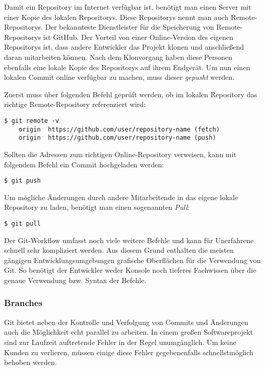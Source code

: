 Damit ein Repository im Internet verfügbar ist, benötigt man einen Server mit
einer Kopie des lokalen Repositorys. Diese Repositorys nennt man auch
Remote-Repositorys. Der bekannteste Dienstleister für die Speicherung
von Remote-Repositorys ist GitHub. Der Vorteil von einer Online-Version des
eigenen Repositorys ist, dass andere Entwickler das Projekt klonen und
anschließend daran mitarbeiten können. Nach dem Klonvorgang haben diese Personen
ebenfalls eine lokale Kopie des Repositorys auf ihrem Endgerät. Um nun einen
lokalen Commit online verfügbar zu machen, muss dieser \emph{gepusht} werden.

Zuerst muss über folgenden Befehl geprüft werden, ob im lokalen Repository das
richtige Remote-Repository referenziert wird:

\begin{lstlisting}[style=Bash]
    $ git remote -v
    origin	https://github.com/user/repository-name (fetch)
    origin	https://github.com/user/repository-name (push)
\end{lstlisting}

Sollten die Adressen zum richtigen Online-Repository verweisen, kann mit
folgendem Befehl ein Commit hochgeladen werden:

\begin{lstlisting}[style=Bash]
    $ git push
\end{lstlisting}

\newpage

Um mögliche Änderungen durch andere Mitarbeitende in das eigene lokale
Repository zu laden, benötigt man einen sogenannten \emph{Pull}:

\begin{lstlisting}[style=Bash]
    $ git pull
\end{lstlisting}

Der Git-Workflow umfasst noch viele weitere Befehle und kann für Unerfahrene
schnell sehr kompliziert werden. Aus diesem Grund enthalten die meisten gängigen
Entwicklungsumgebungen grafische Oberflächen für die Verwendung von Git. So
benötigt der Entwickler weder Konsole noch tieferes Fachwissen über die genaue
Verwendung bzw. Syntax der Befehle.

\subsubsection{Branches}
Git bietet neben der Kontrolle und Verfolgung von Commits und Änderungen auch
die Möglichkeit echt parallel zu arbeiten. In einem großen Softwareprojekt sind
zur Laufzeit auftretende Fehler in der Regel unumgänglich. Um keine Kunden zu
verlieren, müssen einige diese Fehler gegebenenfalls schnellstmöglich behoben
werden.

